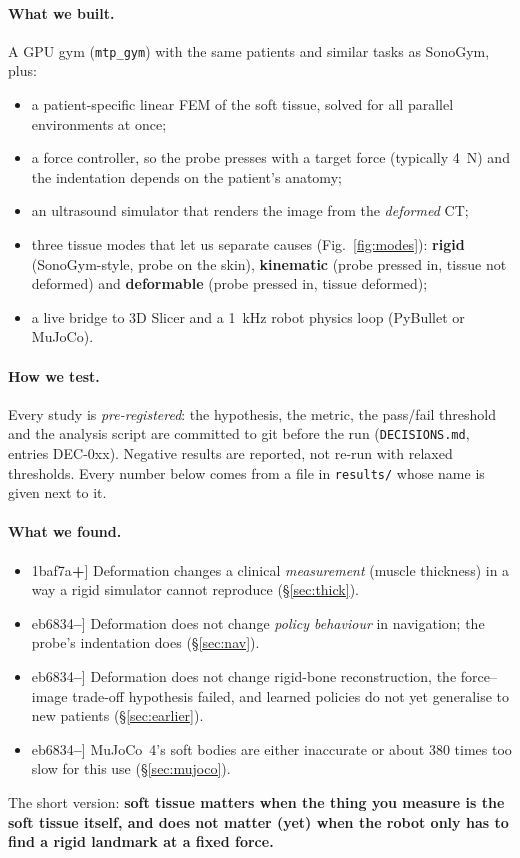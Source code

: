 \documentclass[10pt,a4paper,twocolumn]{article}
\newcommand{\src}[1]{\texttt{\footnotesize #1}}
\newcommand{\dec}[1]{\textsf{#1}}
\newcommand{\pos}{\textcolor[HTML]{1baf7a}{\textbf{+}}}
\newcommand{\negr}{\textcolor[HTML]{eb6834}{\textbf{--}}}
\begin{document}
\paragraph{What we built.} A GPU gym (\src{mtp\_gym}) with the same patients and similar tasks as SonoGym, plus:
\begin{itemize}
  \item a patient-specific linear FEM of the soft tissue, solved for all parallel environments at once;
  \item a force controller, so the probe presses with a target force (typically 4~N) and the indentation depends on
    the patient's anatomy;
  \item an ultrasound simulator that renders the image from the \emph{deformed} CT;
  \item three tissue modes that let us separate causes (Fig.~\ref{fig:modes}):
    \textbf{rigid} (SonoGym-style, probe on the skin),
    \textbf{kinematic} (probe pressed in, tissue not deformed) and
    \textbf{deformable} (probe pressed in, tissue deformed);
  \item a live bridge to 3D Slicer and a 1~kHz robot physics loop (PyBullet or MuJoCo).
\end{itemize}

\paragraph{How we test.} Every study is \emph{pre-registered}: the hypothesis, the metric, the pass/fail threshold
and the analysis script are committed to git before the run (\src{DECISIONS.md}, entries \dec{DEC-0xx}).
Negative results are reported, not re-run with relaxed thresholds. Every number below comes from a file in
\src{results/} whose name is given next to it.

\paragraph{What we found.}
\begin{itemize}
  \item[\pos] Deformation changes a clinical \emph{measurement} (muscle thickness) in a way a rigid simulator cannot
    reproduce (\S\ref{sec:thick}).
  \item[\negr] Deformation does not change \emph{policy behaviour} in navigation; the probe's indentation does
    (\S\ref{sec:nav}).
  \item[\negr] Deformation does not change rigid-bone reconstruction, the force--image trade-off hypothesis failed,
    and learned policies do not yet generalise to new patients (\S\ref{sec:earlier}).
  \item[\negr] MuJoCo~4's soft bodies are either inaccurate or about 380 times too slow for this use
    (\S\ref{sec:mujoco}).
\end{itemize}
The short version: \textbf{soft tissue matters when the thing you measure is the soft tissue itself, and does not
matter (yet) when the robot only has to find a rigid landmark at a fixed force.}
\end{document}
